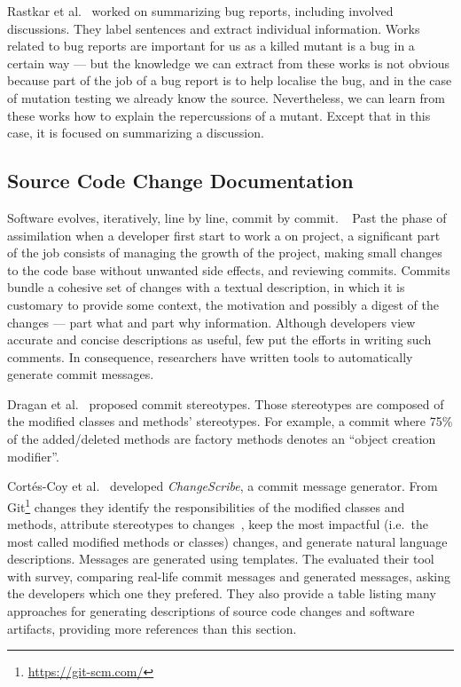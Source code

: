 \documentclass[11pt]{sdm_internship}
\newcommand{\rephrase}[1]{\colorbox{BlueViolet!60}{\textcolor{white}{\textbf{$\sim$#1}}}}
\theoremstyle{definition}
\begin{document}
Rastkar et al.~\cite{rastkar2010summarizing} worked on summarizing bug reports, including involved discussions.
They label sentences and extract individual information.
Works related to bug reports are important for us as a killed mutant is a bug in a certain way --- but the knowledge we can extract from these works is not obvious because part of the job of a bug report is to help localise the bug, and in the case of mutation testing we already know the source.
Nevertheless, we can learn from these works how to explain the repercussions of a mutant.
Except that in this case, it is focused on summarizing a discussion.\rephrase{}

\subsection{Source Code Change Documentation}%
\label{ssec:commit_generation}
Software evolves, iteratively, line by line, commit by commit.\rephrase{}
Past the phase of assimilation when a developer first start to work a on project, a significant part of the job consists of managing the growth of the project, making small changes to the code base without unwanted side effects, and reviewing commits.
Commits bundle a cohesive set of changes with a textual description, in which it is customary to provide some context, the motivation and possibly a digest of the changes --- part what and part why information.
Although developers view accurate and concise descriptions as useful, few put the efforts in writing such comments.
In consequence, researchers have written tools to automatically generate commit messages.

Dragan et al.~\cite{dragan2011using} proposed commit stereotypes.
Those stereotypes are composed of the modified classes and methods' stereotypes.
For example, a commit where 75\% of the added/deleted methods are factory methods denotes an ``object creation modifier''.

Cort\'es-Coy et al.~\cite{cortes2014automatically,linares2015changescribe} developed \textit{ChangeScribe}, a commit message generator.
From Git\footnote{\url{https://git-scm.com/}} changes they identify the responsibilities of the modified classes and methods, attribute stereotypes to changes~\cite{dragan2011using}, keep the most impactful (i.e.\ the most called modified methods or classes) changes, and generate natural language descriptions.
Messages are generated using templates.
The evaluated their tool with survey, comparing real-life commit messages and generated messages, asking the developers which one they prefered.
They also provide a table listing many approaches for generating descriptions of source code changes and software artifacts, providing more references than this section.
\end{document}

